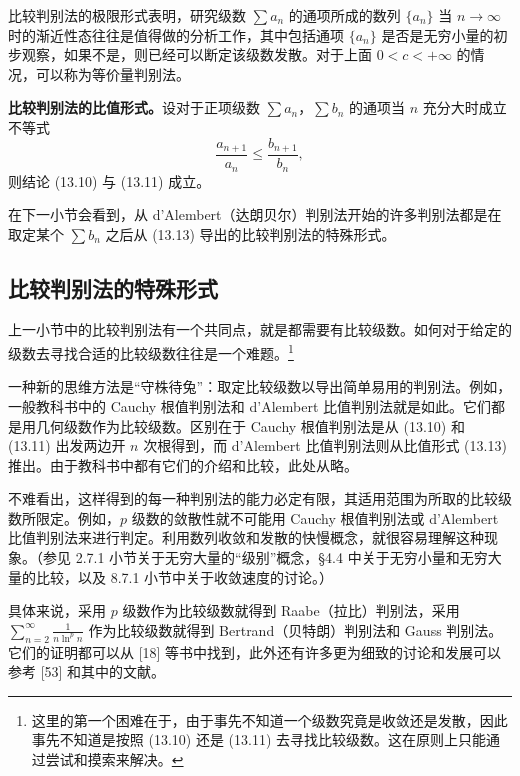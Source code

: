 比较判别法的极限形式表明，研究级数 $\sum a_n$ 的通项所成的数列 $\{a_n\}$ 当 $n\to\infty$ 时的渐近性态往往是值得做的分析工作，其中包括通项 $\{a_n\}$ 是否是无穷小量的初步观察，如果不是，则已经可以断定该级数发散。对于上面 $0<c<+\infty$ 的情况，可以称为等价量判别法。

\textbf{比较判别法的比值形式。}设对于正项级数 $\sum a_n$，$\sum b_n$ 的通项当 $n$ 充分大时成立不等式
\begin{equation}
\frac{a_{n+1}}{a_n}\leq\frac{b_{n+1}}{b_n},
\tag{13.13}
\end{equation}
则结论 (13.10) 与 (13.11) 成立。

在下一小节会看到，从 d'Alembert（达朗贝尔）判别法开始的许多判别法都是在取定某个 $\sum b_n$ 之后从 (13.13) 导出的比较判别法的特殊形式。

\subsection{比较判别法的特殊形式}

上一小节中的比较判别法有一个共同点，就是都需要有比较级数。如何对于给定的级数去寻找合适的比较级数往往是一个难题。\footnote{这里的第一个困难在于，由于事先不知道一个级数究竟是收敛还是发散，因此事先不知道是按照 (13.10) 还是 (13.11) 去寻找比较级数。这在原则上只能通过尝试和摸索来解决。}

一种新的思维方法是“守株待兔”：取定比较级数以导出简单易用的判别法。例如，一般教科书中的 Cauchy 根值判别法和 d'Alembert 比值判别法就是如此。它们都是用几何级数作为比较级数。区别在于 Cauchy 根值判别法是从 (13.10) 和 (13.11) 出发两边开 $n$ 次根得到，而 d'Alembert 比值判别法则从比值形式 (13.13) 推出。由于教科书中都有它们的介绍和比较，此处从略。

不难看出，这样得到的每一种判别法的能力必定有限，其适用范围为所取的比较级数所限定。例如，$p$ 级数的敛散性就不可能用 Cauchy 根值判别法或 d'Alembert 比值判别法来进行判定。利用数列收敛和发散的快慢概念，就很容易理解这种现象。（参见 2.7.1 小节关于无穷大量的“级别”概念，§4.4 中关于无穷小量和无穷大量的比较，以及 8.7.1 小节中关于收敛速度的讨论。）

具体来说，采用 $p$ 级数作为比较级数就得到 Raabe（拉比）判别法，采用 $\sum_{n=2}^{\infty}\frac1{n\ln^p n}$ 作为比较级数就得到 Bertrand（贝特朗）判别法和 Gauss 判别法。它们的证明都可以从 [18] 等书中找到，此外还有许多更为细致的讨论和发展可以参考 [53] 和其中的文献。

